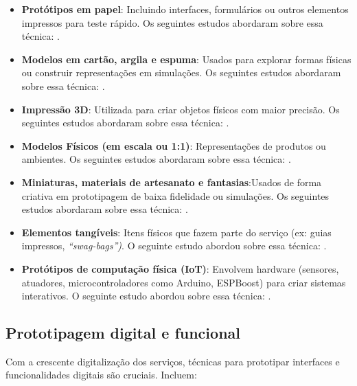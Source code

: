 \begin{itemize}
	\item \textbf{Protótipos em papel}:  Incluindo interfaces, formulários ou outros elementos impressos para teste rápido. Os seguintes estudos abordaram sobre essa técnica: .
	
	\item \textbf{Modelos em cartão, argila e espuma}: Usados para explorar formas físicas ou construir representações em simulações. Os seguintes estudos abordaram sobre essa técnica: .
	
	\item \textbf{Impressão 3D}: Utilizada para criar objetos físicos com maior precisão. Os seguintes estudos abordaram sobre essa técnica: .
	
	\item \textbf{Modelos Físicos (em escala ou 1:1)}: Representações de produtos ou ambientes. Os seguintes estudos abordaram sobre essa técnica: .
	
	\item \textbf{Miniaturas, materiais de artesanato e fantasias}:Usados de forma criativa em prototipagem de baixa fidelidade ou simulações. Os seguintes estudos abordaram sobre essa técnica: .
	
	\item \textbf{Elementos tangíveis}: Itens físicos que fazem parte do serviço (ex: guias impressos, \textit{``swag-bags'')}. O seguinte estudo abordou sobre essa técnica: .
	
	\item \textbf{Protótipos de computação física (IoT)}: Envolvem hardware (sensores, atuadores, microcontroladores como Arduino, ESPBoost) para criar sistemas interativos. O seguinte estudo abordou sobre essa técnica: .
\end{itemize}

\subsection{Prototipagem digital e funcional}

Com a crescente digitalização dos serviços, técnicas para prototipar interfaces e funcionalidades digitais são cruciais. Incluem:

